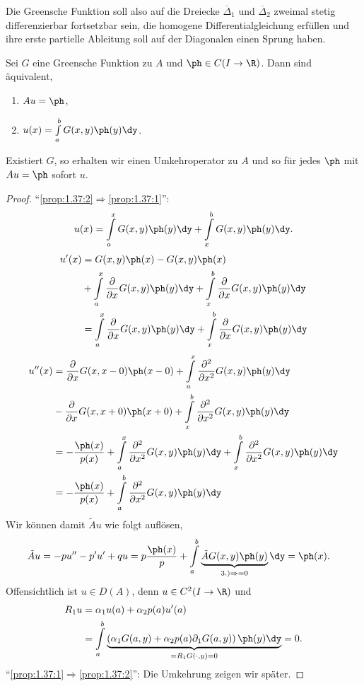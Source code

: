 Die Greensche Funktion soll also auf die Dreiecke $\overline{\Delta}_1$ und
$\overline{\Delta}_2$ zweimal stetig differenzierbar fortsetzbar sein, die
homogene Differentialgleichung erfüllen und ihre erste partielle Ableitung soll
auf der Diagonalen einen Sprung haben.

\begin{prop}
\label{prop:1.37}
Sei $G$ eine Greensche Funktion zu $A$ und $\ph\in C(I\to\R)$. Dann sind
äquivalent,
\begin{enumerate}[label=(\roman{*})]
  \item\label{prop:1.37:1} $Au = \ph$,
  \item\label{prop:1.37:2} $u(x) = \int\limits_a^b G(x,y)\ph(y)\dy$.\fishhere
\end{enumerate}
\end{prop}
Existiert $G$, so erhalten wir einen Umkehroperator zu $A$ und so für jedes
$\ph$ mit $Au=\ph$ sofort $u$.
\begin{proof}
``\ref{prop:1.37:2}$\Rightarrow$\ref{prop:1.37:1}'':
\begin{align*}
u(x) = \int\limits_a^x G(x,y)\ph(y)\dy + \int\limits_x^b G(x,y)\ph(y)\dy.
\end{align*}
\begin{align*}
u'(x) &= G(x,y)\ph(x) - G(x,y)\ph(x) \\
&+\int\limits_a^x \frac{\partial}{\partial x}G(x,y)\ph(y)\dy +
\int\limits_x^b \frac{\partial}{\partial x}G(x,y)\ph(y)\dy\\
&= \int\limits_a^x \frac{\partial}{\partial x}G(x,y)\ph(y)\dy +
\int\limits_x^b \frac{\partial}{\partial x}G(x,y)\ph(y)\dy
\end{align*}
\begin{align*}
u''(x) &=
\frac{\partial}{\partial x} G(x,x-0)\ph(x-0) + 
\int\limits_a^x \frac{\partial^2}{\partial x^2} G(x,y)\ph(y)\dy \\
 &-\frac{\partial}{\partial x} G(x,x+0)\ph(x+0) + 
\int\limits_x^b \frac{\partial^2}{\partial x^2} G(x,y)\ph(y)\dy\\
&= -\frac{\ph(x)}{p(x)} + 
\int\limits_a^x \frac{\partial^2}{\partial x^2} G(x,y)\ph(y)\dy +
\int\limits_x^b \frac{\partial^2}{\partial x^2} G(x,y)\ph(y)\dy\\
&= -\frac{\ph(x)}{p(x)} + 
\int\limits_a^b \frac{\partial^2}{\partial x^2} G(x,y)\ph(y)\dy
\end{align*}
Wir können damit $\tilde{A}u$ wie folgt auflösen,
\begin{align*}
\tilde{A}u &= -pu'' - p'u' + qu
= p\frac{\ph(x)}{p} + \int\limits_a^b
\underbrace{\tilde{A}G(x,y)\ph(y)}_{3.) \Rightarrow = 0}\dy = \ph(x).
\end{align*}
Offensichtlich ist $u\in D(A)$, denn $u\in C^2(I\to\R)$ und
\begin{align*}
R_1u &= \alpha_1 u(a) + \alpha_2p(a)u'(a) \\
&=\int\limits_a^b \underbrace{\left(\alpha_1G(a,y) + \alpha_2p(a) \partial_1
G(a,y) \right)\ph(y)\dy}_{=R_1G(\cdot,y)=0} = 0.
\end{align*}
``\ref{prop:1.37:1}$\Rightarrow$\ref{prop:1.37:2}'': Die Umkehrung zeigen wir
später.\qedhere
\end{proof}


